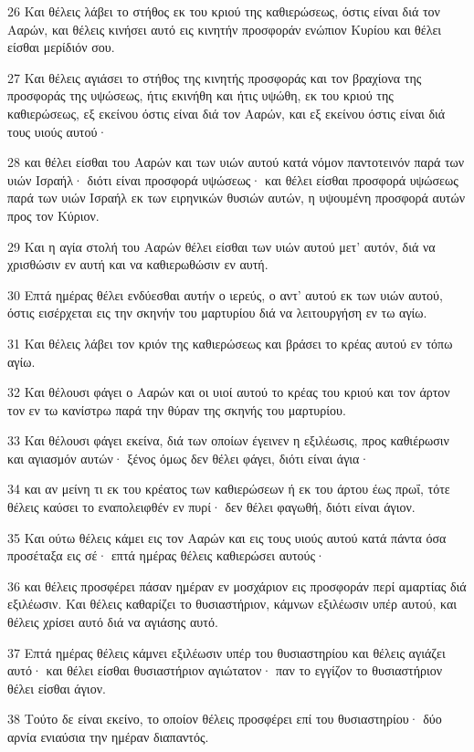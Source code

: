 \par 26 Και θέλεις λάβει το στήθος εκ του κριού της καθιερώσεως, όστις είναι διά τον Ααρών, και θέλεις κινήσει αυτό εις κινητήν προσφοράν ενώπιον Κυρίου και θέλει είσθαι μερίδιόν σου.
\par 27 Και θέλεις αγιάσει το στήθος της κινητής προσφοράς και τον βραχίονα της προσφοράς της υψώσεως, ήτις εκινήθη και ήτις υψώθη, εκ του κριού της καθιερώσεως, εξ εκείνου όστις είναι διά τον Ααρών, και εξ εκείνου όστις είναι διά τους υιούς αυτού·
\par 28 και θέλει είσθαι του Ααρών και των υιών αυτού κατά νόμον παντοτεινόν παρά των υιών Ισραήλ· διότι είναι προσφορά υψώσεως· και θέλει είσθαι προσφορά υψώσεως παρά των υιών Ισραήλ εκ των ειρηνικών θυσιών αυτών, η υψουμένη προσφορά αυτών προς τον Κύριον.
\par 29 Και η αγία στολή του Ααρών θέλει είσθαι των υιών αυτού μετ' αυτόν, διά να χρισθώσιν εν αυτή και να καθιερωθώσιν εν αυτή.
\par 30 Επτά ημέρας θέλει ενδύεσθαι αυτήν ο ιερεύς, ο αντ' αυτού εκ των υιών αυτού, όστις εισέρχεται εις την σκηνήν του μαρτυρίου διά να λειτουργήση εν τω αγίω.
\par 31 Και θέλεις λάβει τον κριόν της καθιερώσεως και βράσει το κρέας αυτού εν τόπω αγίω.
\par 32 Και θέλουσι φάγει ο Ααρών και οι υιοί αυτού το κρέας του κριού και τον άρτον τον εν τω κανίστρω παρά την θύραν της σκηνής του μαρτυρίου.
\par 33 Και θέλουσι φάγει εκείνα, διά των οποίων έγεινεν η εξιλέωσις, προς καθιέρωσιν και αγιασμόν αυτών· ξένος όμως δεν θέλει φάγει, διότι είναι άγια·
\par 34 και αν μείνη τι εκ του κρέατος των καθιερώσεων ή εκ του άρτου έως πρωΐ, τότε θέλεις καύσει το εναπολειφθέν εν πυρί· δεν θέλει φαγωθή, διότι είναι άγιον.
\par 35 Και ούτω θέλεις κάμει εις τον Ααρών και εις τους υιούς αυτού κατά πάντα όσα προσέταξα εις σέ· επτά ημέρας θέλεις καθιερώσει αυτούς·
\par 36 και θέλεις προσφέρει πάσαν ημέραν εν μοσχάριον εις προσφοράν περί αμαρτίας διά εξιλέωσιν. Και θέλεις καθαρίζει το θυσιαστήριον, κάμνων εξιλέωσιν υπέρ αυτού, και θέλεις χρίσει αυτό διά να αγιάσης αυτό.
\par 37 Επτά ημέρας θέλεις κάμνει εξιλέωσιν υπέρ του θυσιαστηρίου και θέλεις αγιάζει αυτό· και θέλει είσθαι θυσιαστήριον αγιώτατον· παν το εγγίζον το θυσιαστήριον θέλει είσθαι άγιον.
\par 38 Τούτο δε είναι εκείνο, το οποίον θέλεις προσφέρει επί του θυσιαστηρίου· δύο αρνία ενιαύσια την ημέραν διαπαντός.
